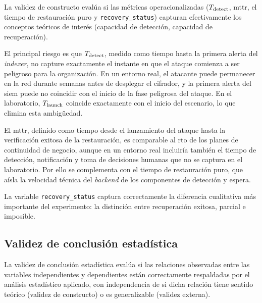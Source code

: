 \documentclass[../main.tex]{subfiles}
\begin{document}
La validez de constructo evalúa si las métricas operacionalizadas
($T_{\text{detect}}$, \gls{mttr}, el tiempo de restauración puro y
\mbox{\texttt{recovery\_status}})
capturan efectivamente los conceptos teóricos de interés (capacidad de detección,
capacidad de recuperación).

El principal riesgo es que $T_{\text{detect}}$, medido como tiempo hasta la primera alerta
del \emph{indexer}, no capture exactamente el instante en que el ataque comienza
a ser peligroso para la organización. En un entorno real, el atacante puede
permanecer en la red durante semanas antes de desplegar el cifrador, y la primera
alerta del \gls{siem} puede no coincidir con el inicio de la fase peligrosa del
ataque. En el laboratorio, $T_{\text{launch}}$ coincide exactamente con el inicio del
escenario, lo que elimina esta ambigüedad.

El \gls{mttr}, definido como tiempo desde el lanzamiento del ataque hasta la
verificación exitosa de la restauración, es comparable al \gls{rto} de los planes
de continuidad de negocio, aunque en un entorno real incluiría también el tiempo
de detección, notificación y toma de decisiones humanas que no se captura en el
laboratorio. Por ello se complementa con el tiempo de restauración puro, que aísla
la velocidad técnica del \emph{backend} de los componentes de detección y espera.

La variable \mbox{\texttt{recovery\_status}} captura correctamente la diferencia
cualitativa más importante del experimento: la distinción entre recuperación
exitosa, parcial e imposible.

\subsection{Validez de conclusión estadística}
\label{sec:validez-estadistica}

La validez de conclusión estadística evalúa si las relaciones observadas entre
las variables independientes y dependientes están correctamente respaldadas por
el análisis estadístico aplicado, con independencia de si dicha relación tiene
sentido teórico (validez de constructo) o es generalizable (validez externa).
\end{document}
